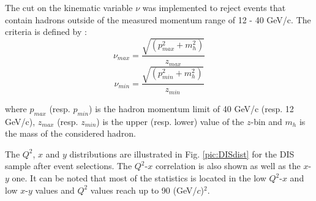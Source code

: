 The cut on the kinematic variable $\nu$ was implemented to reject events that contain hadrons outside of the measured
momentum range of 12 - 40 GeV/c. The criteria is defined by :
\begin{equation}
  \nu_{max} = \frac{\sqrt{(p^2_{max}+m^2_h)}}{z_{max}}
\end{equation}
\begin{equation}
  \nu_{min} = \frac{\sqrt{(p^2_{min}+m^2_h)}}{z_{min}}
\end{equation}

where $p_{max}$ (resp. $p_{min}$) is the hadron momentum limit of 40 GeV/c (resp. 12 GeV/c), $z_{max}$ (resp. $z_{min}$)
is the upper (resp. lower) value of the $z$-bin and $m_h$ is the mass of the considered hadron.

The $Q^2$, $x$ and $y$ distributions are illustrated in Fig. \ref{pic:DISdist} for the DIS sample after event selections. The $Q^2$-$x$ correlation is also shown as well as the $x$-$y$ one. It can be noted that most of the statistics is located in the low $Q^2$-$x$ and low $x$-$y$ values and $Q^2$ values reach up to 90 (GeV/$c$)$^2$.

